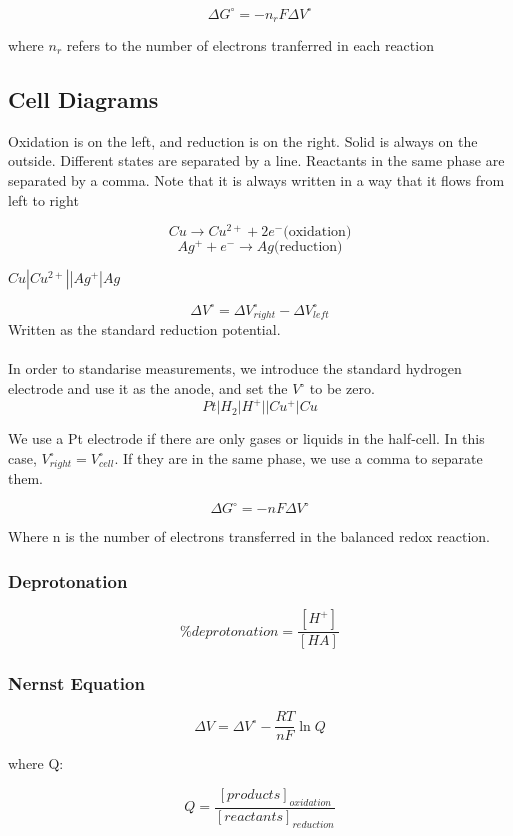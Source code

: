 \documentclass{article}
\begin{document}
\[
\Delta G^{\circ} = - n_r F \Delta V^{\circ}
\]

where $n_r$ refers to the number of electrons tranferred in each reaction

\subsection{Cell Diagrams}

Oxidation is on the left, and reduction is on the right. Solid is always on the outside. Different states are separated by a line. Reactants in the same phase are separated by a comma. Note that it is always written in a way that it flows from left to right

\[
Cu \rightarrow Cu^{2+} + 2e^- \text{(oxidation)}
\]
\[
Ag^+ + e^- \rightarrow Ag \text{(reduction)}
\]

\begin{center}
$Cu|Cu^{2+}||Ag^{+}|Ag$
\end{center}

\[
\Delta V^{\circ} = \Delta V^{\circ}_{right} - \Delta V^{\circ}_{left}
\]
Written as the standard reduction potential.
\\
\\
In order to standarise measurements, we introduce the standard hydrogen electrode and use it as the anode, and set the $V^{\circ}$ to be zero.
\[
Pt|H_2|H^+||Cu^{+}|Cu
\]

We use a Pt electrode if there are only gases or liquids in the half-cell. In this case, $V^{\circ}_{right} = V^{\circ}_{cell}$. If they are in the same phase, we use a comma to separate them.

\[
\Delta G^{\circ} = - nF \Delta V^{\circ}
\]

Where n is the number of electrons transferred in the balanced redox reaction. 

\subsubsection{Deprotonation}

\[
\% deprotonation = \frac{[H^+]}{[HA]}
\]

\subsubsection{Nernst Equation}
\[
\Delta V = \Delta V^{\circ} - \frac{RT}{nF} \ln Q
\]

where Q:

\[
Q = \frac{[products]_{oxidation}}{[reactants]_{reduction}}
\]
\end{document}
